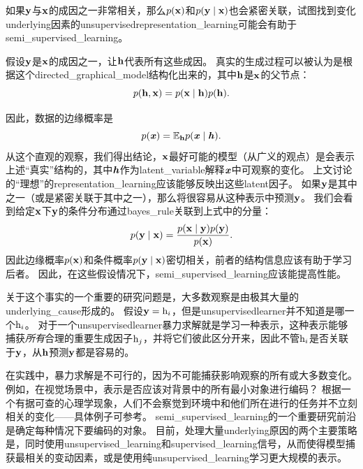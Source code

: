 

如果$\mathbf{y}$与$\mathbf{x}$的成因之一非常相关，那么$p(\mathbf{x})$和$p(\mathbf{y} \mid \mathbf{x})$也会紧密关联，试图找到变化\gls{underlying}因素的\gls{unsupervised}\gls{representation_learning}可能会有助于\gls{semi_supervised_learning}。



假设$\mathbf{y}$是$\mathbf{x}$的成因之一，让$\mathbf{h}$代表所有这些成因。
真实的生成过程可以被认为是根据这个\gls{directed_graphical_model}结构化出来的，其中$\mathbf{h}$是$\mathbf{x}$的父节点：
\begin{equation}
	p(\mathbf{h}, \mathbf{x}) = p(\mathbf{x} \mid \mathbf{h}) p(\mathbf{h}).
\end{equation}


因此，数据的边缘概率是
\begin{equation}
	p(\boldsymbol{\mathit{x}}) = \mathbb{E}_{\mathbf{h}} p(\boldsymbol{\mathit{x}} \mid \boldsymbol{\mathit{h}}).
\end{equation}
从这个直观的观察，我们得出结论，$\mathbf{x}$最好可能的模型（从广义的观点）是会表示上述``真实''结构的，其中$\boldsymbol{\mathit{h}}$作为\gls{latent_variable}解释$\boldsymbol{\mathit{x}}$中可观察的变化。
上文讨论的``理想''的\gls{representation_learning}应该能够反映出这些\gls{latent}因子。
如果$\mathbf{y}$是其中之一（或是紧密关联于其中之一），那么将很容易从这种表示中预测$\mathbf{y}$。
我们会看到给定$\mathbf{x}$下$\mathbf{y}$的条件分布通过\gls{bayes_rule}关联到上式中的分量：
\begin{equation}
	p(\mathbf{y} \mid \mathbf{x}) = \frac{ p(\mathbf{x} \mid \mathbf{y}) p(\mathbf{y}) }{p(\mathbf{x})}.
\end{equation}
因此边缘概率$p(\mathbf{x})$和条件概率$p(\mathbf{y} \mid \mathbf{x})$密切相关，前者的结构信息应该有助于学习后者。
因此，在这些假设情况下，\gls{semi_supervised_learning}应该能提高性能。


关于这个事实的一个重要的研究问题是，大多数观察是由极其大量的\gls{underlying_cause}形成的。
假设$\mathbf{y} = \mathrm{h}_i$，但是\gls{unsupervised}\gls{learner}并不知道是哪一个$\mathrm{h}_i$。
对于一个\gls{unsupervised}\gls{learner}暴力求解就是学习一种表示，这种表示能够捕获\emph{所有}合理的重要生成因子$\mathrm{h}_j$，并将它们彼此区分开来，因此不管$\mathrm{h}_i$是否关联于$\mathbf{y}$，从$\mathbf{h}$预测$\mathbf{y}$都是容易的。


在实践中，暴力求解是不可行的，因为不可能捕获影响观察的所有或大多数变化。
例如，在视觉场景中，表示是否应该对背景中的所有最小对象进行编码？
根据一个有据可查的心理学现象，人们不会察觉到环境中和他们所在进行的任务并不立刻相关的变化——具体例子可参考\cite{simons1998failure}。
\gls{semi_supervised_learning}的一个重要研究前沿是确定每种情况下要编码的对象。
目前，处理大量\gls{underlying}原因的两个主要策略是，同时使用\gls{unsupervised_learning}和\gls{supervised_learning}信号，从而使得模型捕获最相关的变动因素，或是使用纯\gls{unsupervised_learning}学习更大规模的表示。


